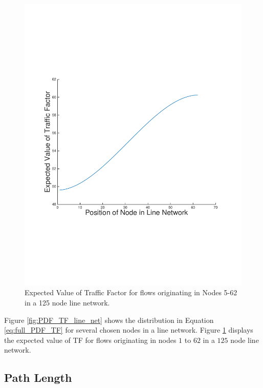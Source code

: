 \begin{figure}
\begin{centering}
    \includegraphics[scale=0.4, clip=true, trim=15mm 65mm 20mm 65mm]{figures/EV_TF_line_net_125.pdf}
    \caption{Expected Value of Traffic Factor for flows originating in Nodes 5-62 in a 125 node line network.}
    \label{fig:EV_TF_line_net}
\end{centering}
\end{figure}

Figure \ref{fig:PDF_TF_line_net} shows the distribution in Equation \ref{eq:full_PDF_TF} for several chosen nodes in a line network.  Figure \ref{fig:EV_TF_line_net} displays the expected value of TF for flows originating in nodes $1$ to $62$ in a $125$ node line network.  

\subsection{Path Length}

